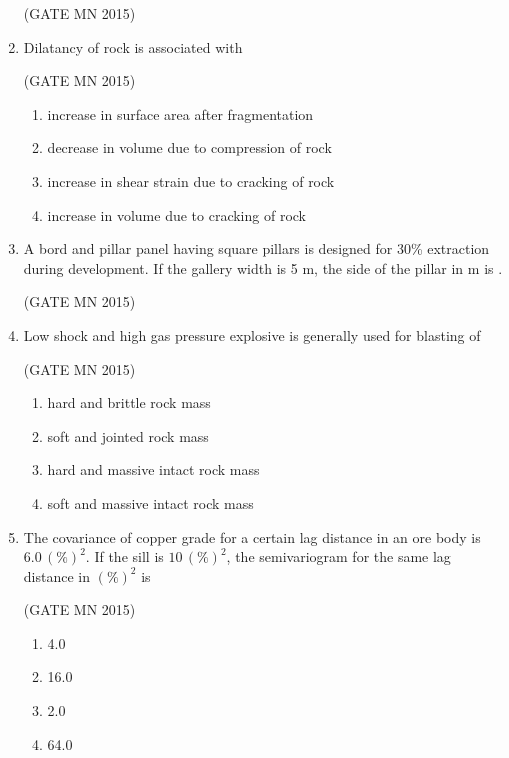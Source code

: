 \documentclass[journal]{IEEEtran}
\begin{document}
\begin{enumerate}
\hfill(GATE MN 2015)

\item Dilatancy of rock is associated with  

	\hfill(GATE MN 2015)

\begin{enumerate}
\item increase in surface area after fragmentation  
\item decrease in volume due to compression of rock  
\item increase in shear strain due to cracking of rock  
\item increase in volume due to cracking of rock  
\end{enumerate}


\item A bord and pillar panel having square pillars is designed for 30\% extraction during development. If the gallery width is 5 m, the side of the pillar in m is \underline{\hspace{2cm}}.  

	\hfill(GATE MN 2015)


\item Low shock and high gas pressure explosive is generally used for blasting of 

	\hfill(GATE MN 2015)
\begin{multicols}{2}
\begin{enumerate}
\item hard and brittle rock mass  
\item soft and jointed rock mass  
\item hard and massive intact rock mass  
\item soft and massive intact rock mass  
\end{enumerate}
\end{multicols}

\item The covariance of copper grade for a certain lag distance in an ore body is $6.0 \, (\%)^2$.  
If the sill is $10 \, (\%)^2$, the semivariogram for the same lag distance in $(\%)^2$ is 

\hfill(GATE MN 2015)
\begin{multicols}{4}
\begin{enumerate}
\item 4.0  
\item 16.0  
\item 2.0  
\item 64.0  
\end{enumerate}
\end{multicols}


\end{enumerate}
\end{document}
